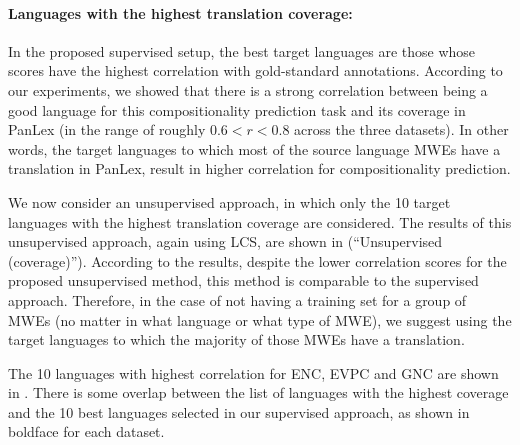 \documentclass[output=paper,modfonts,nonflat]{langsci/langscibook}
\begin{document}
\paragraph*{Languages with the highest translation coverage:}

In the proposed supervised setup, the best target languages are those
whose scores have the highest correlation with gold-standard
annotations.  According to our experiments, we showed that there is a
strong correlation between being a good language for this
compositionality prediction task and its coverage in PanLex (in the
range of roughly $0.6 < r < 0.8$ across the three datasets). In other words, the
target languages to which most of the source language MWEs have a
translation in PanLex, result in higher correlation for
compositionality prediction.

We now consider an unsupervised approach, in which only the 10
target languages with the highest translation coverage are
considered. The results of this unsupervised approach, again using
LCS, are shown in  (``Unsupervised
(coverage)''). According to the results, despite the lower correlation
scores for the proposed unsupervised method, this method is comparable
to the supervised approach.  Therefore, in the case of not having a
training set for a group of MWEs (no matter in what language or what
type of MWE), we suggest using the target languages to which the
majority of those MWEs have a translation.

The 10 languages with highest correlation for ENC, EVPC and GNC are
shown in . There is some overlap between the
list of languages with the highest coverage and the 10 best languages
selected in our supervised approach, as shown in boldface for each
dataset.
\end{document}
